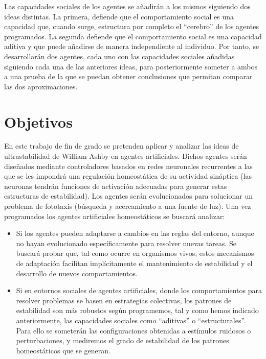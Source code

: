 Las capacidades sociales de los agentes se añadirán a los mismos siguiendo dos ideas distintas. La primera, defiende que el comportamiento social es una capacidad que, cuando surge, estructura por completo el ``cerebro'' de
los agentes programados. La segunda defiende que el comportamiento social es una capacidad aditiva y que puede añadirse de manera independiente al individuo. Por tanto, se desarrollarán dos agentes, cada uno con las capacidades
sociales añadidas siguiendo cada una de las anteriores ideas, para posteriormente someter a ambos a una prueba de la que se puedan obtener conclusiones que permitan comparar las dos aproximaciones.

\section{Objetivos}
En este trabajo de fin de grado se pretenden aplicar y analizar las ideas de
ultrastabilidad de William Ashby en agentes artificiales. Dichos agentes serán diseñados mediante controladores
basados en redes neuronales recurrentes a las que se les impondrá una regulación
homeostática de su actividad sináptica (las neuronas tendrán funciones de activación
adecuadas para generar estas estructuras de estabilidad). Los agentes serán evolucionados
para solucionar un problema de fototaxis (búsqueda y acercamiento a una fuente de luz).
Una vez programados los agentes artificiales homeostáticos se buscará analizar:

\begin{itemize}
\item Si los agentes pueden adaptarse a cambios en las reglas del entorno, aunque no hayan
evolucionado específicamente para resolver nuevas tareas. Se buscará probar que, tal
como ocurre en organismos vivos, estos mecanismos de adaptación facilitan
implícitamente el mantenimiento de estabilidad y el desarrollo de nuevos
comportamientos.
\item  Si en entornos sociales de agentes artificiales, donde los comportamientos para resolver
problemas se basen en estrategias colectivas, los patrones de estabilidad son más
robustos según programemos, tal y como hemos indicado anteriormente, las capacidades sociales como ``aditivas'' o ``estructurales''.
Para ello se someterán las configuraciones obtenidas a estímulos ruidosos o
perturbaciones, y mediremos el grado de estabilidad de los patrones homeostáticos que se generan.
\end{itemize}

